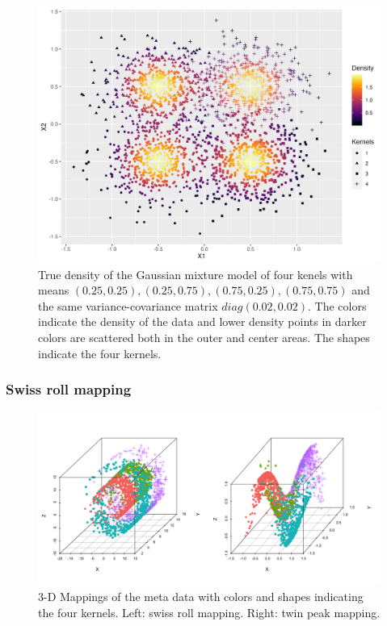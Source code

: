 \documentclass[11pt,a4paper,]{article}
\begin{document}
\begin{figure}

{\centering \includegraphics[width=0.8\linewidth]{figures/truedensity_4kernels} 

}

\caption{True density of the Gaussian mixture model of four kenels with means $(0.25, 0.25), (0.25, 0.75), (0.75, 0.25), (0.75, 0.75)$ and the same variance-covariance matrix $diag(0.02, 0.02)$. The colors indicate the density of the data and lower density points in darker colors are scattered both in the outer and center areas. The shapes indicate the four kernels.}\label{fig:metadensity}
\end{figure}

\hypertarget{swiss-roll-mapping}{%
\subsubsection{Swiss roll mapping}\label{swiss-roll-mapping}}

\begin{figure}

{\centering \includegraphics[width=0.8\linewidth]{figures/mappings_sr_tp} 

}

\caption{3-D Mappings of the meta data with colors and shapes indicating the four kernels. Left: swiss roll mapping. Right: twin peak mapping.}\label{fig:mappings}
\end{figure}
\end{document}
